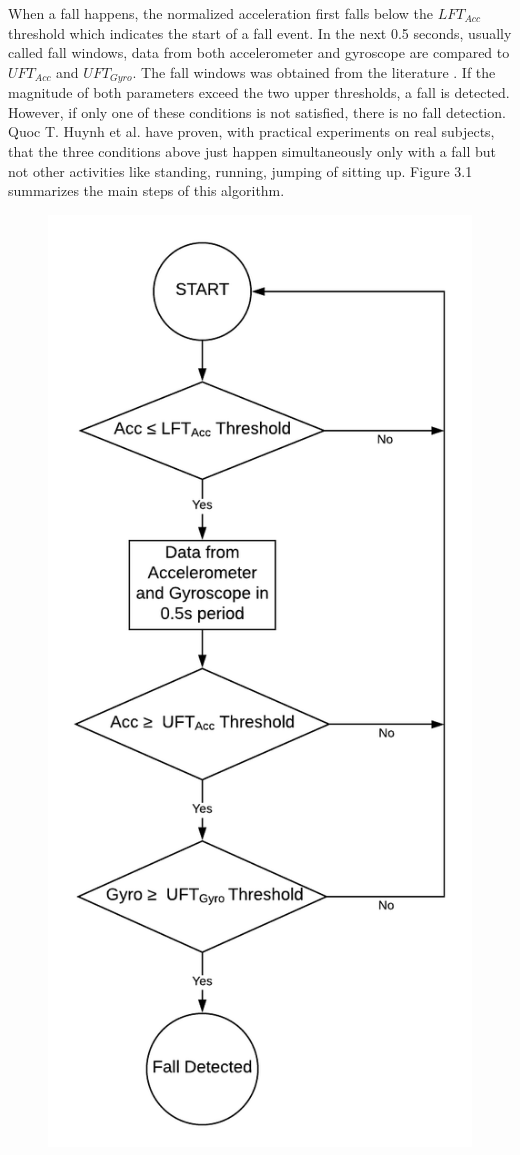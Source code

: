 \documentclass[letterpaper,12pt,titlepage,oneside,final]{book}
\begin{document}
When a fall happens, the normalized acceleration first falls below the $LFT_{Acc}$ threshold
which indicates the start of a fall event. In the next 0.5 seconds, usually called fall windows,
data from both accelerometer and gyroscope are compared to $UFT_{Acc}$ and $UFT_{Gyro}$. The fall windows was obtained from the literature \cite{window_1}\cite{window_2}. If
the magnitude of both parameters exceed the two upper thresholds, a fall is detected.
However, if only one of these conditions is not satisfied, there is no fall detection. Quoc T.
Huynh et al. \cite{main_quoc} have proven, with practical experiments on real subjects, that the three
conditions above just happen simultaneously only with a fall but not other activities like
standing, running, jumping of sitting up. Figure 3.1 summarizes the main steps of this
algorithm.
\begin{figure}
	\centering
	\includegraphics[scale=0.8]{algorithm_diagram}

\end{figure}
\end{document}
